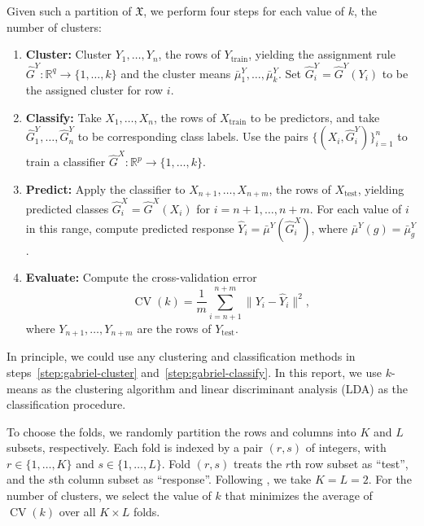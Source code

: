 \documentclass[11pt]{article}
\newcommand{\CV}{\operatorname{CV}}
\newcommand{\R}{\mathbb{R}}
\newcommand{\dataX}{\mathfrak{X}}
\newcommand{\Xtrain}{X_{\text{train}}}
\newcommand{\Ytrain}{Y_{\text{train}}}
\newcommand{\Xtest}{X_{\text{test}}}
\newcommand{\Ytest}{Y_{\text{test}}}
\newcommand{\hGX}{\hat G^{X}}
\newcommand{\hGY}{\hat G^{Y}}
\newcommand{\bmuY}{\bar \mu^{Y}}
\begin{document}
Given such a partition of $\dataX$, we perform four steps for each value of
$k$, the number of clusters:
\begin{enumerate}
  \item \label{step:gabriel-cluster}
    \textbf{Cluster:}
    Cluster $Y_{1}, \dotsc, Y_n$, the rows of $\Ytrain$, yielding the
    assignment rule $\hGY : \R^q \to \{ 1, \dotsc, k \}$ and the
    cluster means $\bmuY_1, \dotsc, \bmuY_k$.  Set $\hGY_i = \hGY(Y_i)$ to
    be the assigned cluster for row $i$.

  \item \label{step:gabriel-classify}
    \textbf{Classify:}
    Take $X_{1}, \dotsc, X_n$, the rows of $\Xtrain$ to be predictors,
    and take $\hGY_1, \dotsc, \hGY_n$ to be corresponding class labels.  Use
    the pairs $\{ (X_i, \hGY_i) \}_{i=1}^{n}$ to train a classifier
    $\hGX : \R^p \to \{ 1, \dotsc, k \}$.

  \item \label{step:gabriel-predict}
    \textbf{Predict:}
    Apply the classifier to $X_{n+1}, \dotsc, X_{n+m}$, the rows of
    $\Xtest$, yielding predicted classes $\hGX_i = \hGX(X_i)$ for
    $i = n+1, \dotsc, n+m$.  For each value of $i$ in this range, compute
    predicted response $\hat Y_i = \bmuY(\hGX_i)$, where
    $\bmuY(g) = \bmuY_g$.

  \item \label{step:gabriel-evaluate}
    \textbf{Evaluate:}
    Compute the cross-validation error
    \[
      \CV(k) = \frac{1}{m} \sum_{i=n+1}^{n+m} \|Y_i - \hat Y_i\|^2,
    \]
    where $Y_{n+1}, \dotsc, Y_{n+m}$ are the rows of $\Ytest$.
\end{enumerate}
\noindent
In principle, we could use any clustering and classification methods in
steps~\ref{step:gabriel-cluster} and~\ref{step:gabriel-classify}.  In this
report, we use $k$-means as the clustering algorithm and linear discriminant
analysis (LDA) as the classification procedure.


To choose the folds, we randomly partition the rows and columns into $K$ and
$L$ subsets, respectively.  Each fold is indexed by a pair $(r,s)$ of
integers, with $r \in \{1, \dotsc, K\}$ and $s \in \{1, \dotsc, L\}$.  Fold
$(r,s)$ treats the $r$th row subset as ``test'', and the $s$th column subset
as ``response''.  Following \citet{owen2009bi}, we take $K = L = 2$.  For the
number of clusters, we select the value of $k$ that minimizes the average of
$\CV(k)$ over all $K \times L$ folds.
\end{document}
